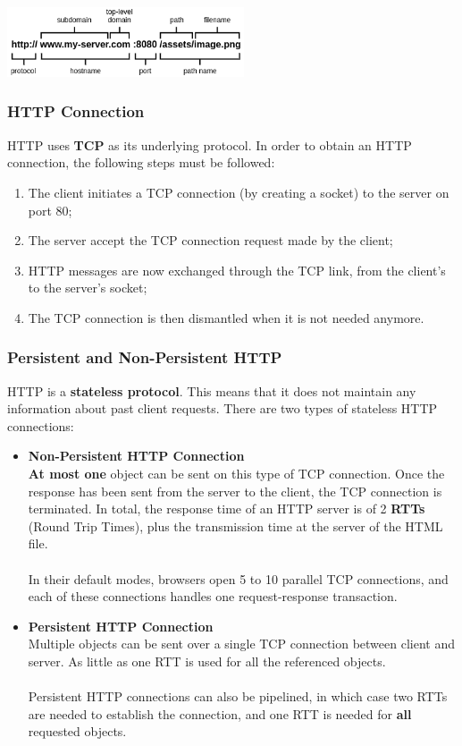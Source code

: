 \documentclass{article}
\begin{document}
\centerline{\includegraphics[width=7cm]{./assets/url.png}}

\subsubsection{HTTP Connection}
HTTP uses \textbf{TCP} as its underlying protocol. In order to obtain an HTTP connection, the following steps must be followed:

\begin{enumerate}
	\item The client initiates a TCP connection (by creating a socket) to the server on port 80;
	\item The server accept the TCP connection request made by the client;
	\item HTTP messages are now exchanged through the TCP link, from the client's to the server's socket;
	\item The TCP connection is then dismantled when it is not needed anymore. 
\end{enumerate}

\subsubsection{Persistent and Non-Persistent HTTP}
HTTP is a \textbf{stateless protocol}. This means that it does not maintain any information about past client requests. There are two types of stateless HTTP connections:

\begin{itemize}
	\item \textbf{Non-Persistent HTTP Connection}
	\vspace{.2cm} \\
	\textbf{At most one} object can be sent on this type of TCP connection. Once the response has been sent from the server to the client, the TCP connection is terminated. In total, the response time of an HTTP server is of 2 \textbf{RTTs} (Round Trip Times), plus the transmission time at the server of the HTML file. \\ \\
	In their default modes, browsers open 5 to 10 parallel TCP connections, and each of these connections handles one request-response transaction.
	
	\item \textbf{Persistent HTTP Connection}
	\vspace{.2cm} \\
	Multiple objects can be sent over a single TCP connection between client and server. As little as one RTT is used for all the referenced objects. \\ \\
	Persistent HTTP connections can also be pipelined, in which case two RTTs are needed to establish the connection, and one RTT is needed for \textbf{all} requested objects.
\end{itemize}
\end{document}
